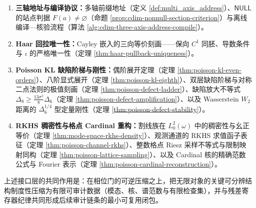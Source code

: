 \begin{enumerate}
  \item \textbf{三轴地址与编译协议：}多轴前缀地址（定义 \ref{def:multi_axis_address}）、\(\mathsf{NULL}\) 的站点判据 \(F(a)\neq\varnothing\)（命题 \ref{prop:cdim-nonnull-section-criterion}）与离线编译—核验流程（算法 \ref{alg:cdim-three-axis-address-compile}）。
  \item \textbf{Haar 回拉唯一性：}Cayley 嵌入的三向等价刻画——保向 \(C^1\) 同胚、导数条件与 \(\iota\) 的严格唯一性（定理 \ref{thm:haar-pullback-uniqueness}）。
  \item \textbf{Poisson KL 缺陷阶梯与刚性：}偶阶展开定理（定理 \ref{thm:poisson-kl-even-orders}）、八阶显式展开（定理 \ref{thm:poisson-kl-eighth}）、双层缺陷阶梯与对称二点法则的极值刻画（定理 \ref{thm:poisson-defect-ladder}）、缺陷放大不等式 \(\Delta_8\ge\frac{13\sigma^2}{8}\Delta_6\)（定理 \ref{thm:poisson-defect-amplification}）、以及 Wasserstein \(W_2\) 距离的 \(\Delta_6^{1/4}\) 型定量刚性（定理 \ref{thm:poisson-defect-stability}）。
  \item \textbf{RKHS 稠密性与格点 Cardinal 重构：}割线族在 \(L^2_0(\omega)\) 中的稠密性与幺正等价（定理 \ref{thm:mode-space-rkhs-density}）、观测通道的 RKHS 求值函子表征（定理 \ref{thm:poisson-channel-rkhs}）、整数格点 Riesz 采样不等式与限制映射同构（定理 \ref{thm:poisson-lattice-sampling}）、以及 Cardinal 核的精确范数公式与 Fourier 表示（定理 \ref{thm:poisson-cardinal-reconstruction}）。
\end{enumerate}
上述接口层的共同作用是：在相位门的可逆压缩之上，把无限对象的关键可分辨结构制度性压缩为有限可审计数据（模态、核、谱范数与有限检查集），并与残差寄存器纪律共同形成后续审计链条的最小可复用闭包。

\endinput
